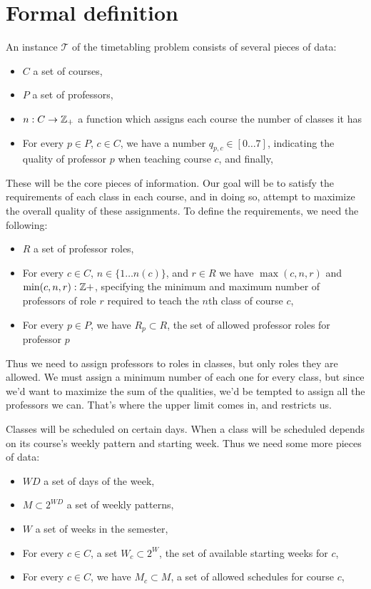 \section{Formal definition}
An instance $\mathcal{T}$ of the timetabling problem consists of several pieces of data:

\begin{itemize}
\item $C$ a set of courses,
\item $P$ a set of professors,
\item $n: C \to \mathbb{Z}_+$ a function which assigns each course the number of classes it has
\item For every $p \in P$, $c \in C$, we have a number $q_{p, c} \in [0 \dots 7]$, indicating the quality of professor $p$ when teaching course $c$, and finally,
\end{itemize}

These will be the core pieces of information. Our goal will be to satisfy the requirements of each class in each course, and in doing so, attempt to maximize the overall quality of these assignments. To define the requirements, we need the following:
\begin{itemize}
\item $R$ a set of professor roles,
\item For every $c \in C$, $n \in \{1 \dots n(c)\}$, and $r \in R$ we have $\max(c, n, r)$ and $\min(c, n, r): \mathbb{Z}+$, specifying the minimum and maximum number of professors of role $r$ required to teach the $n$th class of course $c$,
\item For every $p \in P$, we have $R_p \subset R$, the set of allowed professor roles for professor $p$
\end{itemize}

Thus we need to assign professors to roles in classes, but only roles they are allowed. We must assign a minimum number of each one for every class, but since we'd want to maximize the sum of the qualities, we'd be tempted to assign all the professors we can. That's where the upper limit comes in, and restricts us.

Classes will be scheduled on certain days. When a class will be scheduled depends on its course's weekly pattern and starting week. Thus we need some more pieces of data:
\begin{itemize}
\item $WD$ a set of days of the week,
\item $M \subset 2^{WD}$ a set of weekly patterns,
\item $W$ a set of weeks in the semester,
\item For every $c \in C$, a set $W_c \subset 2^W$, the set of available starting weeks for $c$,
\item For every $c \in C$, we have $M_c \subset M$, a set of allowed schedules for course $c$,
\end{itemize}

